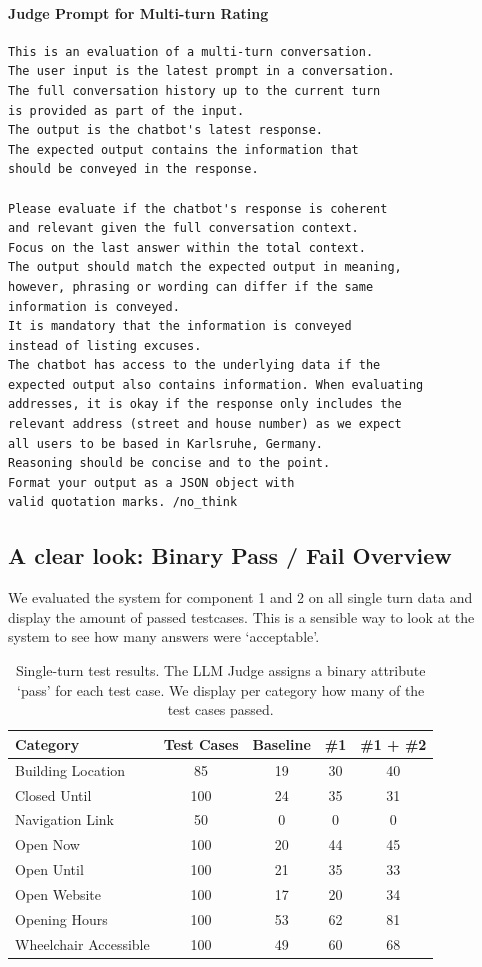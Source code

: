 \documentclass{article}
\begin{document}
\paragraph{Judge Prompt for Multi-turn Rating}
\begin{verbatim}
This is an evaluation of a multi-turn conversation.
The user input is the latest prompt in a conversation.
The full conversation history up to the current turn
is provided as part of the input.
The output is the chatbot's latest response.
The expected output contains the information that
should be conveyed in the response.

Please evaluate if the chatbot's response is coherent
and relevant given the full conversation context.
Focus on the last answer within the total context.
The output should match the expected output in meaning,
however, phrasing or wording can differ if the same
information is conveyed.
It is mandatory that the information is conveyed
instead of listing excuses.
The chatbot has access to the underlying data if the
expected output also contains information. When evaluating
addresses, it is okay if the response only includes the
relevant address (street and house number) as we expect
all users to be based in Karlsruhe, Germany.
Reasoning should be concise and to the point.
Format your output as a JSON object with
valid quotation marks. /no_think
\end{verbatim}

\subsection{A clear look: Binary Pass / Fail Overview}

We evaluated the system for component 1 and 2 on all single turn data and display the amount of passed testcases. This is a sensible way to look at the system to see how many answers were `acceptable'.

\begin{table}[H]
\centering
\begin{tabular}{|l|c|c|c|c|}
\hline
\textbf{Category} & \textbf{Test Cases} & \textbf{Baseline} & \textbf{\#1} & \textbf{\#1 + \#2} \\
\hline
Building Location     & 85  & 19  & 30  & 40 \\
Closed Until          & 100 & 24  & 35  & 31 \\
Navigation Link       & 50  & 0   & 0   & 0  \\
Open Now              & 100 & 20  & 44  & 45 \\
Open Until            & 100 & 21  & 35  & 33 \\
Open Website          & 100 & 17  & 20  & 34 \\
Opening Hours         & 100 & 53  & 62  & 81 \\
Wheelchair Accessible & 100 & 49  & 60  & 68 \\
\hline
\end{tabular}
\caption{Single-turn test results. The LLM Judge assigns a binary attribute `pass' for each test case. We display per category how many of the test cases passed.}
\end{table}
\end{document}
